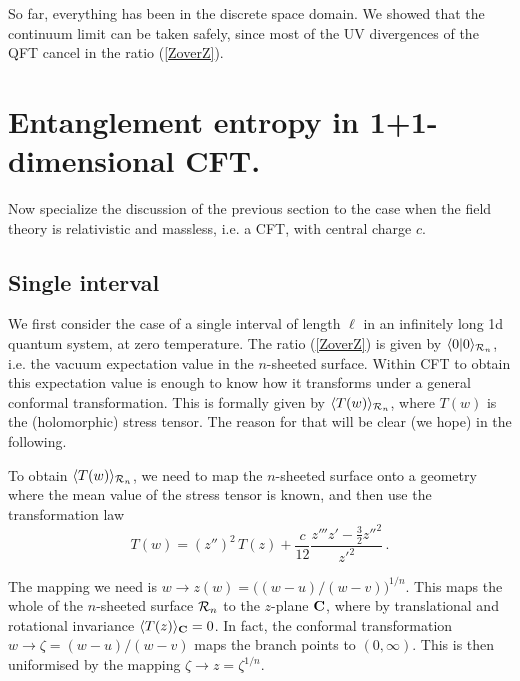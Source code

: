 \documentclass[12pt]{article}
\begin{document}
So far, everything has been in the discrete space domain. 
We showed\cite{cc-04} that the continuum limit can be taken safely, 
since most of the UV divergences of the QFT cancel in the ratio 
(\ref{ZoverZ}).



\section{Entanglement entropy in 1+1-dimensional CFT.}
\label{cftsec}

Now specialize the discussion of the previous section
to the case when the field theory is relativistic and massless, i.e. a
CFT, with central charge $c$.


\subsection{Single interval}

We first consider the case of a single interval of length $\ell$ in an 
infinitely long 1d quantum system, at zero temperature. 
The ratio (\ref{ZoverZ}) is given by $\langle 0|0\rangle_{{\cal R}_n}$, i.e.
the vacuum expectation value in the $n$-sheeted surface. 
Within CFT to obtain this expectation value is enough to know how 
it transforms under a general conformal transformation. 
This is formally given by $\langle T(w) \rangle_{{\cal R}_n}$, where
$T(w)$ is the (holomorphic) stress tensor.
The reason for that will be clear (we hope) in the following.  

To obtain $\langle T(w) \rangle_{{\cal R}_n}$, we need to map the 
$n$-sheeted surface onto a geometry where the mean value of the 
stress tensor is known, and then use the transformation law\cite{confbook} 
\begin{equation}
\label{schwartz}
T(w)=(z'')^2\,T(z)+\frac{c}{12} \frac{z'''z'-\frac32{z''}^2}{{z'}^2}\,.
\end{equation} 

The mapping we need is $w\to z(w)=\big((w-u)/(w-v)\big)^{1/n}$.
This maps the whole of the $n$-sheeted surface ${\cal R}_n$ to the 
$z$-plane $\bf C$, where by translational and rotational invariance 
$\langle T(z)\rangle_{\bf C}=0$.
In fact, the conformal transformation $w\to\zeta=(w-u)/(w-v)$ maps the branch 
points to $(0,\infty)$. This is then uniformised by the mapping 
$\zeta\to z=\zeta^{1/n}$. 
\end{document}
